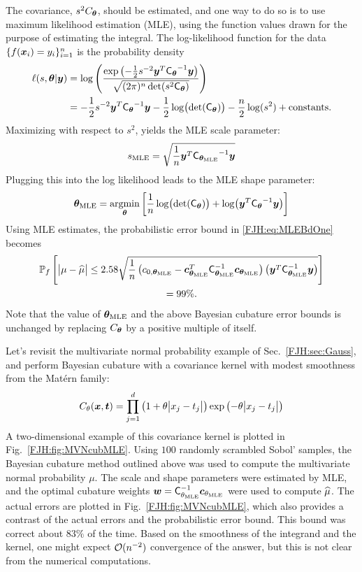 \documentclass[graybox,footinfo]{svmult}
\begin{document}
The covariance, $s^2 C_{{\boldsymbol{\theta}}}$, should be estimated, and one way to do so is to use 
maximum likelihood estimation (MLE), using the function values drawn for the purpose of 
estimating the integral.  The log-likelihood function for the data $ \{f({\boldsymbol{x}}_i )= 
y_i\}_{i=1}^n$ is the probability density
\begin{align*}
\ell(s,{\boldsymbol{\theta}} | {\boldsymbol{y}}) & = \log \left(\frac{\exp\left(- \frac 12 s^{-2} {\boldsymbol{y}}^T 
\mathsf{C_{{\boldsymbol{\theta}}}}^{-1} {\boldsymbol{y}}\right)}{\sqrt{(2\pi)^n  \det(s^2 
\mathsf{C_{{\boldsymbol{\theta}}}})}}\right)\\
& = - \frac 12 s^{-2} {\boldsymbol{y}}^T \mathsf{C_{{\boldsymbol{\theta}}}}^{-1} {\boldsymbol{y}} -\frac 12  
\log \bigl(
\det(\mathsf{C_{{\boldsymbol{\theta}}}}) \bigr) - \frac n2 \log(s^2) + \text{constants}.
\end{align*}
Maximizing with respect to $s^2$, yields the MLE scale parameter:
\[
s_{\text{MLE}} =  \sqrt{\frac 1n {\boldsymbol{y}}^T \mathsf{C_{{\boldsymbol{\theta}}_{\text{MLE}}}}^{-1} {\boldsymbol{y}}}
\]
Plugging this into the log likelihood leads to the MLE shape parameter: 
\[
{\boldsymbol{\theta}}_{\text{MLE}} =  \operatorname*{argmin}_{\boldsymbol{\theta}} \left[\frac 1n \log \bigl(\det(\mathsf{C_{{\boldsymbol{\theta}}}}) 
\bigr) 
+ \log\bigl({\boldsymbol{y}}^T \mathsf{C_{{\boldsymbol{\theta}}}}^{-1} {\boldsymbol{y}} \bigr)  \right ]
\]
Using MLE estimates, the probabilistic error 
bound in \eqref{FJH:eq:MLEBdOne} becomes
\begin{multline} \label{FJH:eq:MLEBdTwo}
\Prob_f\left[\abs{\mu - \hmu} \le 2.58 
\sqrt{\frac 1n \left(c_{0,\bstheta_\MLE} - \bsc_{\bstheta_\MLE} ^T 
	\mC_{\bstheta_\MLE}^{-1} \bsc_{\bstheta_\MLE} \right)  \left(\bsy^T 
	\mathsf{C}_{\bstheta_\MLE}^{-1} \bsy\right)}\right] \\
 = 
99\%.
\end{multline}
Note that the value of ${\boldsymbol{\theta}}_{\text{MLE}}$ and the above Bayesian cubature error bounds  
is unchanged by replacing  $C_{\boldsymbol{\theta}}$ by a positive multiple of itself.  

Let's revisit the multivariate normal probability example of Sec.\ \ref{FJH:sec:Gauss}, 
and perform Bayesian cubature with a covariance kernel with modest smoothness from 
the Mat\'ern  family:
\begin{equation} \label{FJH:eq:Matern}
C_\theta(\bsx,\bst) = \prod_{j=1}^d \left(1 + 
\theta\abs{x_j-t_j}\right) \exp\left(-\theta\abs{x_j-t_j}\right)
\end{equation}
A two-dimensional example of this covariance kernel is plotted in Fig.\ 
\ref{FJH:fig:MVNcubMLE}.  Using $100$ randomly scrambled Sobol' samples, the 
Bayesian 
cubature method outlined above was used to compute the multivariate normal probability 
$\mu$.  The scale and shape parameters were estimated by MLE, and the optimal 
cubature weights ${\boldsymbol{w}} = 
\mathsf{C}_{\theta_{\text{MLE}}}^{-1} {\boldsymbol{c}}_{\theta_{\text{MLE}}}$ were used to compute $\widehat{\mu}$.  
The actual errors are plotted in Fig.\ \ref{FJH:fig:MVNcubMLE}, which also provides a 
contrast of the actual errors and the probabilistic error bound.  This bound was correct 
about $83\%$ of the time.  Based on the smoothness of the integrand and the kernel, 
one might expect $\mathcal{O}(n^{-2})$ convergence of the answer, but this is not clear from 
the numerical computations.
\end{document}
